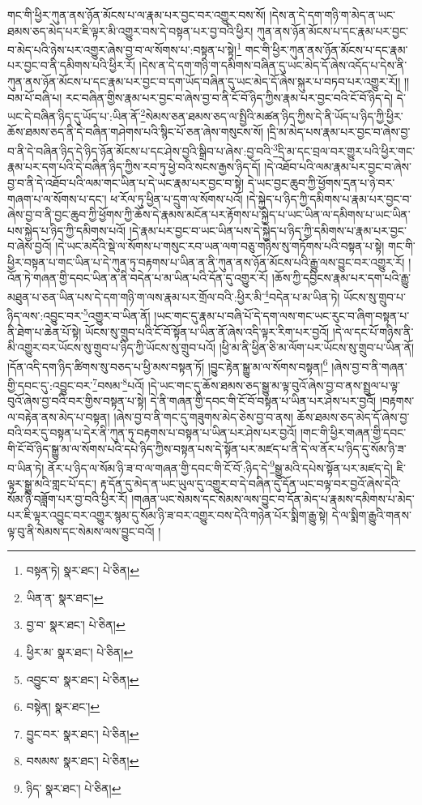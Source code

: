 གང་གི་ཕྱིར་ཀུན་ནས་ཉོན་མོངས་པ་ལ་རྣམ་པར་བྱང་བར་འགྱུར་བས་སོ། །དེས་ན་དེ་དག་གཉི་ག་མེད་ན་ཡང་ཐམས་ཅད་མེད་པར་ཇི་ལྟར་མི་འགྱུར་བས་དེ་བསྟན་པར་བྱ་བའི་ཕྱིར། ཀུན་ནས་ཉོན་མོངས་པ་དང་རྣམ་པར་བྱང་བ་མེད་པའི་ཉེས་པར་འགྱུར་ཞེས་བྱ་བ་ལ་སོགས་པ་:བསྟན་པ་སྟེ།\footnote{བསྟན་ཏེ།  སྣར་ཐང་།  པེ་ཅིན། } གང་གི་ཕྱིར་ཀུན་ནས་ཉོན་མོངས་པ་དང་རྣམ་པར་བྱང་བ་ནི་དམིགས་པའི་ཕྱིར་རོ། །དེས་ན་དེ་དག་གཉི་ག་དམིགས་བཞིན་དུ་ཡང་མེད་དོ་ཞེས་འདོད་པ་དེས་ནི་ཀུན་ནས་ཉོན་མོངས་པ་དང་རྣམ་པར་བྱང་བ་དག་ཡོད་བཞིན་དུ་ཡང་མེད་དོ་ཞེས་སྐུར་པ་བཏབ་པར་འགྱུར་རོ།། །།བམ་པོ་བཞི་པ། རང་བཞིན་གྱིས་རྣམ་པར་བྱང་བ་ཞེས་བྱ་བ་ནི་ངོ་བོ་ཉིད་ཀྱིས་རྣམ་པར་བྱང་བའི་ངོ་བོ་ཉིད་དེ། དེ་ཡང་དེ་བཞིན་ཉིད་དུ་ཡོད་པ་:ཡིན་ནོ་\footnote{ཡིན་ན་  སྣར་ཐང་། }སེམས་ཅན་ཐམས་ཅད་ལ་སྤྱིའི་མཚན་ཉིད་ཀྱིས་དེ་ནི་ཡོད་པ་ཉིད་ཀྱི་ཕྱིར་ཆོས་ཐམས་ཅད་ནི་དེ་བཞིན་གཤེགས་པའི་སྙིང་པོ་ཅན་ཞེས་གསུངས་སོ། །དྲི་མ་མེད་པས་རྣམ་པར་བྱང་བ་ཞེས་བྱ་བ་ནི་དེ་བཞིན་ཉིད་དེ་ཉིད་ཉོན་མོངས་པ་དང་ཤེས་བྱའི་སྒྲིབ་པ་ཞེས་:བྱ་བའི་\footnote{བྱ་བ་  སྣར་ཐང་།  པེ་ཅིན། }དྲི་མ་དང་བྲལ་བར་གྱུར་པའི་ཕྱིར་གང་རྣམ་པར་དག་པའི་དེ་བཞིན་ཉིད་ཀྱིས་རབ་ཏུ་ཕྱེ་བའི་སངས་རྒྱས་ཉིད་དོ། །དེ་འཐོབ་པའི་ལམ་རྣམ་པར་བྱང་བ་ཞེས་བྱ་བ་ནི་དེ་འཐོབ་པའི་ལམ་གང་ཡིན་པ་དེ་ཡང་རྣམ་པར་བྱང་བ་སྟེ། དེ་ཡང་བྱང་ཆུབ་ཀྱི་ཕྱོགས་དྲན་པ་ཉེ་བར་གཞག་པ་ལ་སོགས་པ་དང་། ཕ་རོལ་ཏུ་ཕྱིན་པ་དྲུག་ལ་སོགས་པའོ། །དེ་སྐྱེད་པ་ཉིད་ཀྱི་དམིགས་པ་རྣམ་པར་བྱང་བ་ཞེས་བྱ་བ་ནི་བྱང་ཆུབ་ཀྱི་ཕྱོགས་ཀྱི་ཆོས་དེ་རྣམས་མངོན་པར་རྟོགས་པ་སྐྱེད་པ་ཡང་ཡིན་ལ་དམིགས་པ་ཡང་ཡིན་པས་སྐྱེད་པ་ཉིད་ཀྱི་དམིགས་པའོ། །དེ་རྣམ་པར་བྱང་བ་ཡང་ཡིན་པས་དེ་སྐྱེད་པ་ཉིད་ཀྱི་དམིགས་པ་རྣམ་པར་བྱང་བ་ཞེས་བྱའོ། །དེ་ཡང་མདོའི་སྡེ་ལ་སོགས་པ་གསུང་རབ་ཡན་ལག་བཅུ་གཉིས་སུ་གཏོགས་པའི་བསྟན་པ་སྟེ། གང་གི་ཕྱིར་བསྟན་པ་གང་ཡིན་པ་དེ་ཀུན་ཏུ་བརྟགས་པ་ཡིན་ན་ནི་ཀུན་ནས་ཉོན་མོངས་པའི་རྒྱུ་ལས་བྱུང་བར་འགྱུར་རོ། །འོན་ཏེ་གཞན་གྱི་དབང་ཡིན་ན་ནི་བདེན་པ་མ་ཡིན་པའི་དོན་དུ་འགྱུར་རོ། །ཆོས་ཀྱི་དབྱིངས་རྣམ་པར་དག་པའི་རྒྱུ་མཐུན་པ་ཅན་ཡིན་པས་དེ་དག་གཉི་ག་ལས་རྣམ་པར་གྲོལ་བའི་:ཕྱིར་མི་\footnote{ཕྱིར་མ་  སྣར་ཐང་།  པེ་ཅིན། }བདེན་པ་མ་ཡིན་ཏེ། ཡོངས་སུ་གྲུབ་པ་ཉིད་ལས་:འབྱུང་བར་\footnote{འབྱུང་བ་  སྣར་ཐང་།  པེ་ཅིན། }འགྱུར་བ་ཡིན་ནོ། །ཡང་གང་དུ་རྣམ་པ་བཞི་པོ་དེ་དག་ལས་གང་ཡང་རུང་བ་ཞིག་བསྟན་པ་ནི་ཐེག་པ་ཆེན་པོ་སྟེ། ཡོངས་སུ་གྲུབ་པའི་ངོ་བོ་སྟོན་པ་ཡིན་ནོ་ཞེས་འདི་ལྟར་རིག་པར་བྱའོ། །དེ་ལ་དང་པོ་གཉིས་ནི་མི་འགྱུར་བར་ཡོངས་སུ་གྲུབ་པ་ཉིད་ཀྱི་ཡོངས་སུ་གྲུབ་པའོ། །ཕྱི་མ་ནི་ཕྱིན་ཅི་མ་ལོག་པར་ཡོངས་སུ་གྲུབ་པ་ཡིན་ནོ། །དོན་འདི་དག་ཉིད་ཚིགས་སུ་བཅད་པ་ཕྱི་མས་བསྟན་ཏོ། །བྱུང་རྟེན་སྒྱུ་མ་ལ་སོགས་བསྟན།\footnote{བསྟེན།  སྣར་ཐང་། } །ཞེས་བྱ་བ་ནི་གཞན་གྱི་དབང་དུ་:འབྱུང་བར་\footnote{བྱུང་བར་  སྣར་ཐང་།  པེ་ཅིན། }བསམ་\footnote{བསམས་  སྣར་ཐང་།  པེ་ཅིན། }པའོ། །དེ་ཡང་གང་དུ་ཆོས་ཐམས་ཅད་སྒྱུ་མ་ལྟ་བུའོ་ཞེས་བྱ་བ་ནས་སྤྲུལ་པ་ལྟ་བུའོ་ཞེས་བྱ་བའི་བར་གྱིས་བསྟན་པ་སྟེ། དེ་ནི་གཞན་གྱི་དབང་གི་ངོ་བོ་བསྟན་པ་ཡིན་པར་ཤེས་པར་བྱའོ། །བརྟགས་ལ་བརྟེན་ནས་མེད་པ་བསྟན། །ཞེས་བྱ་བ་ནི་གང་དུ་གཟུགས་མེད་ཅེས་བྱ་བ་ནས། ཆོས་ཐམས་ཅད་མེད་དོ་ཞེས་བྱ་བའི་བར་དུ་བསྟན་པ་དེར་ནི་ཀུན་ཏུ་བརྟགས་པ་བསྟན་པ་ཡིན་པར་ཤེས་པར་བྱའོ། །གང་གི་ཕྱིར་གཞན་གྱི་དབང་གི་ངོ་བོ་ཉིད་སྒྱུ་མ་ལ་སོགས་པའི་དཔེ་ཉིད་ཀྱིས་བསྟན་པས་དེ་སྟོན་པར་མཛད་པ་ནི་དེ་ལ་ནོར་པ་ཉིད་དུ་སོམ་ཉི་ཟ་བ་ཡིན་ཏེ། ནོར་པ་ཉིད་ལ་སོམ་ཉི་ཟ་བ་ལ་གཞན་གྱི་དབང་གི་ངོ་བོ་:ཉིད་དེ་\footnote{ཉིད་  སྣར་ཐང་།  པེ་ཅིན། }སྒྱུ་མའི་དཔེས་སྟོན་པར་མཛད་དེ། ཇི་ལྟར་སྒྱུ་མའི་གླང་པོ་དང་། རྟ་དོན་དུ་མེད་ན་ཡང་ཡུལ་དུ་འགྱུར་བ་དེ་བཞིན་དུ་དོན་ཡང་བལྟ་བར་བྱའོ་ཞེས་དེའི་སོམ་ཉི་བཟློག་པར་བྱ་བའི་ཕྱིར་རོ། །གཞན་ཡང་སེམས་དང་སེམས་ལས་བྱུང་བ་དོན་མེད་པ་རྣམས་དམིགས་པ་མེད་པར་ཇི་ལྟར་འབྱུང་བར་འགྱུར་སྙམ་དུ་སོམ་ཉི་ཟ་བར་འགྱུར་བས་དེའི་གཉེན་པོར་སྨིག་རྒྱུ་སྟེ། དེ་ལ་སྨིག་རྒྱུའི་གནས་ལྟ་བུ་ནི་སེམས་དང་སེམས་ལས་བྱུང་བའོ། །
